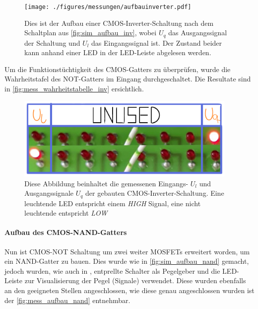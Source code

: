 \documentclass[12pt,english,ngerman]{scrartcl}
\begin{document}
\begin{figure}[H]
  \centering
    \texttt{[image: ./figures/messungen/aufbauinverter.pdf]}
  \caption{Dies ist der Aufbau einer CMOS-Inverter-Schaltung nach dem
  Schaltplan aus \autoref{fig:sim_aufbau_inv}, wobei $U_q$ das Ausgangssignal
  der Schaltung und $U_l$ das Eingangssignal ist. Der Zustand
  beider kann anhand einer LED in der LED-Leiste abgelesen werden.}
  \label{fig:mess_aufbau_inv}
\end{figure}


Um die Funktionstüchtigkeit des CMOS-Gatters zu überprüfen, wurde die
Wahrheitstafel des NOT-Gatters im Eingang durchgeschaltet. Die Resultate
sind in \autoref{fig:mess_wahrheitstabelle_inv} ersichtlich.

\begin{figure}[H]
  \centering
    \includegraphics[width=0.95\textwidth]{./figures/messungen/WahrheitstabelleInverter.pdf}
  \caption{Diese Abbildung beinhaltet die gemessenen Eingangs- $U_l$ und
  Ausgangssignale $U_q$ der gebauten CMOS-Inverter-Schaltung. Eine leuchtende
  LED entspricht einem \textit{HIGH} Signal, eine nicht leuchtende entspricht
  \textit{LOW}} 
\label{fig:mess_wahrheitstabelle_inv}
\end{figure}


\paragraph{Aufbau des CMOS-NAND-Gatters}
Nun ist CMOS-NOT Schaltung um zwei weiter MOSFETs erweitert worden, um ein
NAND-Gatter zu bauen. Dies wurde wie in \autoref{fig:sim_aufbau_nand} gemacht,
jedoch wurden, wie auch in , entprellte Schalter als
Pegelgeber und die LED-Leiste zur Visualisierung der Pegel (Signale) verwendet.
Diese wurden ebenfalls an den geeigneten Stellen angeschlossen, wie diese genau
angeschlossen wurden ist der \autoref{fig:mess_aufbau_nand} entnehmbar.
\end{document}
